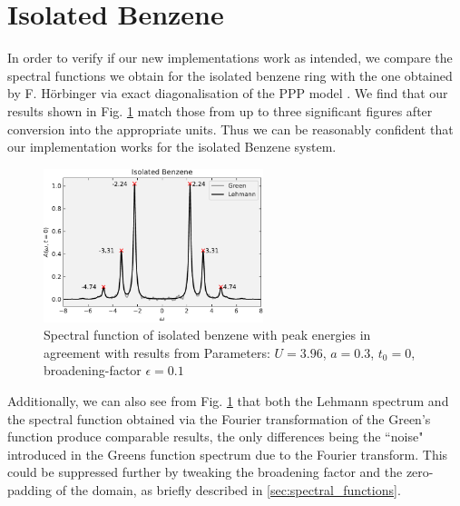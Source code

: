 \section{Isolated Benzene}
    In order to verify if our new implementations work as intended, we compare the spectral functions we obtain for the isolated benzene ring with the one obtained by F. Hörbinger via exact diagonalisation of the PPP model \cite{hoerbinger}. We find that our results shown in Fig. \ref{fig:isolated_benzene} match those from \cite{hoerbinger} up to three significant figures after conversion into the appropriate units. Thus we can be reasonably confident that our implementation works for the isolated Benzene system.

\medskip
\begin{figure}[!hbt]
    \centering
    \includegraphics[width=0.57\textwidth]{graph/isolated_benzene.pdf}
    \caption{Spectral function of isolated benzene with peak energies in agreement with results from \cite{hoerbinger}\newline
    Parameters: $U = 3.96$, $a = 0.3$, $t_0 = 0$, broadening-factor $\epsilon = 0.1 $
    }\label{fig:isolated_benzene}
\end{figure}

Additionally, we can also see from Fig. \ref{fig:isolated_benzene} that both the Lehmann spectrum and the spectral function obtained via the Fourier transformation of the Green's function produce comparable results, the only differences being the ``noise" introduced in the Greens function spectrum due to the Fourier transform. This could be suppressed further by tweaking the broadening factor and the zero-padding of the domain, as briefly described in \ref{sec:spectral_functions}.